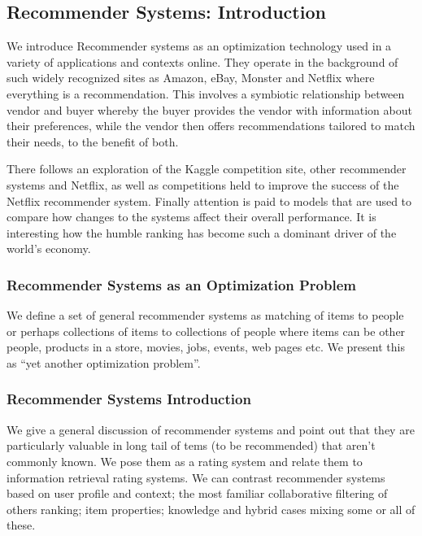 \subsection{Recommender Systems:
Introduction}\label{recommender-systems-introduction}

We introduce Recommender systems as an optimization technology used in a
variety of applications and contexts online. They operate in the
background of such widely recognized sites as Amazon, eBay, Monster and
Netflix where everything is a recommendation. This involves a symbiotic
relationship between vendor and buyer whereby the buyer provides the
vendor with information about their preferences, while the vendor then
offers recommendations tailored to match their needs, to the benefit of
both.

There follows an exploration of the Kaggle competition site, other
recommender systems and Netflix, as well as competitions held to improve
the success of the Netflix recommender system. Finally attention is paid
to models that are used to compare how changes to the systems affect
their overall performance. It is interesting how the humble ranking has
become such a dominant driver of the world's economy.



\subsubsection{Recommender Systems as an Optimization
Problem}\label{recommender-systems-as-an-optimization-problem}

We define a set of general recommender systems as matching of items to
people or perhaps collections of items to collections of people where
items can be other people, products in a store, movies, jobs, events,
web pages etc. We present this as ``yet another optimization problem''.



\subsubsection{Recommender Systems
Introduction}\label{recommender-systems-introduction-1}

We give a general discussion of recommender systems and point out that
they are particularly valuable in long tail of tems (to be recommended)
that aren't commonly known. We pose them as a rating system and relate
them to information retrieval rating systems. We can contrast
recommender systems based on user profile and context; the most familiar
collaborative filtering of others ranking; item properties; knowledge
and hybrid cases mixing some or all of these.

